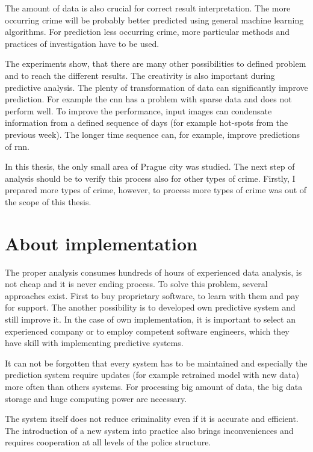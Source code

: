 \documentclass[thesis=M,english]{FITthesis}[2012/10/20]
\begin{document}
The amount of data is also crucial for correct result interpretation. The more occurring crime will be probably better predicted using general machine learning algorithms. For prediction less occurring crime, more particular methods and practices of investigation have to be used. 

The experiments show, that there are many other possibilities to defined problem and to reach the different results. The creativity is also important during predictive analysis. The plenty of transformation of data can significantly improve prediction. For example the \gls{cnn} has a problem with sparse data and does not perform well. To improve the performance, input images can condensate information from a defined sequence of days (for example hot-spots from the previous week). The longer time sequence can, for example, improve predictions of \gls{rnn}.

In this thesis, the only small area of Prague city was studied. The next step of analysis should be to verify this process also for other types of crime. Firstly, I prepared more types of crime, however, to process more types of crime was out of the scope of this thesis. 

\section{About implementation}

The proper analysis consumes hundreds of hours of experienced data analysis, is not cheap and it is never ending process. To solve this problem, several approaches exist. First to buy proprietary software, to learn with them and pay for support. The another possibility is to developed own predictive system and still improve it. 
In the case of own implementation, it is important to select an experienced company or to employ competent software engineers, which they have skill with implementing predictive systems. 

It can not be forgotten that every system has to be maintained and especially the prediction system require updates (for example retrained model with new data) more often than others systems. For processing big amount of data, the big data storage and huge computing power are necessary.

The system itself does not reduce criminality even if it is accurate and efficient. The introduction of a new system into practice also brings inconveniences and requires cooperation at all levels of the police structure. 
\end{document}
